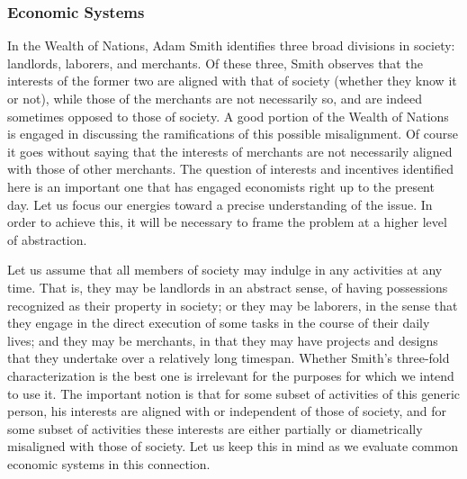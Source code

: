 \documentclass[pra,twocolumn,groupedaddress,10pt]{revtex4}
\theoremstyle{definition}
\begin{document}
\subsubsection{Economic Systems}

In the Wealth of Nations\cite{adamsmith}, Adam Smith identifies three broad divisions in society: landlords, laborers, and merchants. Of these three, Smith observes that the interests of the former two are aligned with that of society (whether they know it or not), while those of the merchants are not necessarily so, and are indeed sometimes opposed to those of society\cite{rothschild}. A good portion of the Wealth of Nations is engaged in discussing the ramifications of this possible misalignment. Of course it goes without saying that the interests of merchants are not necessarily aligned with those of other merchants. The question of interests and incentives identified here is an important one that has engaged economists right up to the present day. Let us focus our energies toward a precise understanding of the issue. In order to achieve this, it will be necessary to frame the problem at a higher level of abstraction.

Let us assume that all members of society may indulge in any activities at any time. That is, they may be landlords in an abstract sense, of having possessions recognized as their property in society; or they may be laborers, in the sense that they engage in the direct execution of some tasks in the course of their daily lives; and they may be merchants, in that they may have projects and designs that they undertake over a relatively long timespan. Whether Smith's three-fold characterization is the best one is irrelevant for the purposes for which we intend to use it. The important notion is that for some subset of activities of this generic person, his interests are aligned with or independent of those of society, and for some subset of activities these interests are either partially or diametrically misaligned with those of society. Let us keep this in mind as we evaluate common economic systems in this connection.
\end{document}
